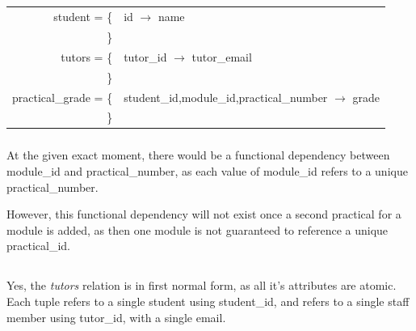 \documentclass[11pt]{article}
\begin{document}
    \subsection{}

    \subsubsection{}

    \begin{tabular}{r l}
        student = \{  & id $\rightarrow$ name \\
        \}\\
        tutors = \{ & tutor\_id $\rightarrow$ tutor\_email \\
        \}\\
        practical\_grade = \{ & student\_id,module\_id,practical\_number $\rightarrow$ grade \\
        \}\\
    \end{tabular}

    \subsubsection{}

    At the given exact moment, there would be a functional dependency between
    module\_id and practical\_number, as each value of module\_id refers to a
    unique practical\_number. 

    However, this functional dependency will not exist once a second practical
    for a module is added, as then one module is not guaranteed to reference a
    unique practical\_id.

    \subsection{}

    \subsubsection{}

    Yes, the \textit{tutors} relation is in first normal form, as all it's
    attributes are atomic. Each tuple refers to a single student using
    student\_id, and refers to a single staff member using tutor\_id, with a
    single email.
    
    \subsubsection{}
\end{document}
